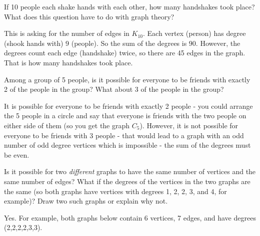 \begin{questions}
\question If 10 people each shake hands with each other, how many handshakes took place?  What does this question have to do with graph theory?

	\begin{answer}
		This is asking for the number of edges in $K_{10}$.  Each vertex (person) has degree (shook hands with) 9 (people).  So the sum of the degrees is $90$.  However, the degrees count each edge (handshake) twice, so there are 45 edges in the graph.  That is how many handshakes took place.%
	\end{answer}
	
	
	

\question Among a group of 5 people, is it possible for everyone to be friends with exactly 2 of the people in the group?  What about 3 of the people in the group?

	\begin{answer}
		It is possible for everyone to be friends with exactly 2 people - you could arrange the 5 people in a circle and say that everyone is friends with the two people on either side of them (so you get the graph $C_5$).  However, it is not possible for everyone to be friends with 3 people - that would lead to a graph with an odd number of odd degree vertices which is impossible - the sum of the degrees must be even.  %
	\end{answer}
	
	



\question Is it possible for two {\em different} graphs to have the same number of vertices and the same number of edges?  What if the degrees of the vertices in the two graphs are the same (so both graphs have vertices with degrees 1, 2, 2, 3, and 4, for example)?  Draw two such graphs or explain why not.

	\begin{answer}
		Yes.  For example, both graphs below contain 6 vertices, 7 edges, and have degrees (2,2,2,2,3,3).
		\begin{center}
		  \hfill
		  \hfill
		  \hfill ~
		\end{center}
	\end{answer}
	

\end{questions}

